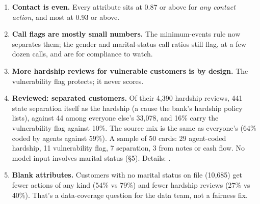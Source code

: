 \documentclass[11pt]{article}
\begin{document}
\begin{enumerate}[leftmargin=1.5em]
\item \textbf{Contact is even.} Every attribute sits at 0.87 or above for \emph{any contact action}, and most at 0.93 or above.
\item \textbf{Call flags are mostly small numbers.} The minimum-events rule now separates them; the gender and marital-status
call ratios still flag, at a few dozen calls, and are for compliance to watch.
\item \textbf{More hardship reviews for vulnerable customers is by design.} The vulnerability flag protects; it never scores.
\item \textbf{Reviewed: separated customers.} Of their 4,390 hardship reviews, 441 state separation itself as the hardship
(a cause the bank's hardship policy lists), against 44 among everyone else's 33,078, and 16\% carry the vulnerability flag
against 10\%. The source mix is the same as everyone's (64\% coded by agents against 59\%). A sample of 50 cards: 29 agent-coded
hardship, 11 vulnerability flag, 7 separation, 3 from notes or cash flow. No model input involves marital status (§5).
Details: .
\item \textbf{Blank attributes.} Customers with no marital status on file (10,685) get fewer actions of any kind (54\% vs 79\%) and fewer hardship reviews (27\% vs 40\%).
That's a data-coverage question for the data team, not a fairness fix.
\end{enumerate}

\end{document}
